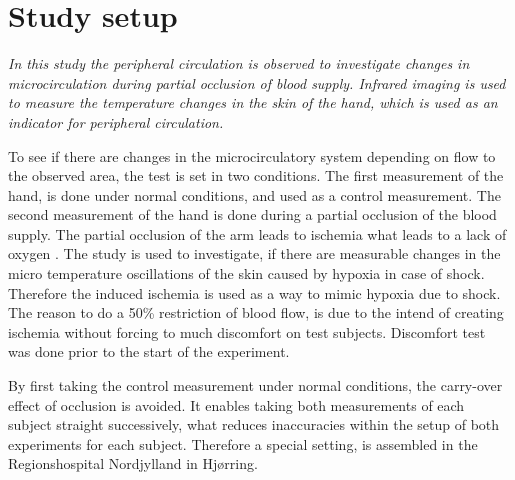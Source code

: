 \chapter{Study setup}

\textit{In this study the peripheral circulation is observed to investigate changes in microcirculation during partial occlusion of blood supply. Infrared imaging is used to measure the temperature changes in the skin of the hand, which is used as an indicator for peripheral circulation.} 


To see if there are changes in the microcirculatory system depending on flow to the observed area, the test is set in two conditions. The first measurement of the hand, is done under normal conditions, and used as a control measurement. The second measurement of the hand is done during a partial occlusion of the blood supply. The partial occlusion of the arm leads to ischemia what leads to a lack of oxygen \cite{martini2012}. The study is used to investigate, if there are measurable changes in the micro temperature oscillations of the skin caused by hypoxia in case of shock. Therefore the induced ischemia is used as a way to mimic hypoxia due to shock.
The reason to do a 50\% restriction of blood flow, is due to the intend of creating ischemia without forcing to much discomfort on test subjects. Discomfort test was done prior to the start of the experiment.

By first taking the control measurement under normal conditions, the carry-over effect of occlusion is avoided. It enables taking both measurements of each subject straight successively, what reduces inaccuracies within the setup of both experiments for each subject. Therefore a special setting, is assembled in the Regionshospital Nordjylland in Hj\o{}rring.